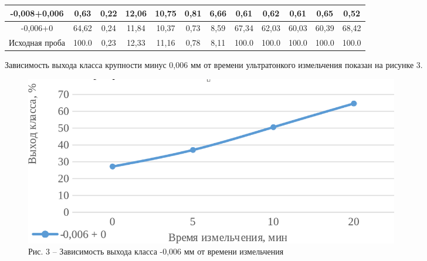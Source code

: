 {\begin{longtable}[c]{|p{}ccccccccccc|}
\multicolumn{1}{|c|}{-0,008+0,006} & \multicolumn{1}{c|}{0,63} & \multicolumn{1}{c|}{0,22} & \multicolumn{1}{c|}{12,06} & \multicolumn{1}{c|}{10,75} & \multicolumn{1}{c|}{0,81} & \multicolumn{1}{c|}{6,66} & \multicolumn{1}{c|}{0,61} & \multicolumn{1}{c|}{0,62} & \multicolumn{1}{c|}{0,61} & \multicolumn{1}{c|}{0,65} & 0,52 \\ \hline
\multicolumn{1}{|c|}{-0,006+0} & \multicolumn{1}{c|}{64,62} & \multicolumn{1}{c|}{0,24} & \multicolumn{1}{c|}{11,84} & \multicolumn{1}{c|}{10,37} & \multicolumn{1}{c|}{0,73} & \multicolumn{1}{c|}{8,59} & \multicolumn{1}{c|}{67,34} & \multicolumn{1}{c|}{62,03} & \multicolumn{1}{c|}{60,03} & \multicolumn{1}{c|}{60,39} & 68,42 \\ \hline
\multicolumn{1}{|c|}{Исходная проба} & \multicolumn{1}{c|}{100.0} & \multicolumn{1}{c|}{0,23} & \multicolumn{1}{c|}{12,33} & \multicolumn{1}{c|}{11,16} & \multicolumn{1}{c|}{0,78} & \multicolumn{1}{c|}{8,11} & \multicolumn{1}{c|}{100.0} & \multicolumn{1}{c|}{100.0} & \multicolumn{1}{c|}{100.0} & \multicolumn{1}{c|}{100.0} & 100.0\\ \hline
\end{longtable}}

Зависимость выхода класса крупности минус 0,006 мм от времени
ультратонкого измельчения показан на рисунке 3.

\begin{figure}[H]
	\centering
	\includegraphics[width=0.8\textwidth]{assets/300.1}
	\caption*{Рис. 3 -- Зависимость выхода класса -0,006 мм от времени измельчения}
\end{figure}

